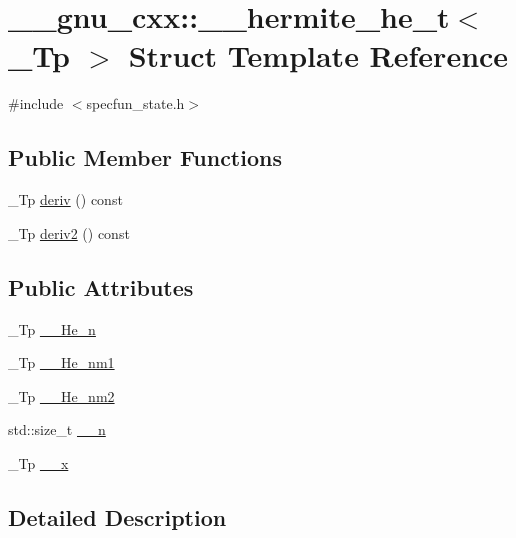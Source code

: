 \hypertarget{struct____gnu__cxx_1_1____hermite__he__t}{}\section{\+\_\+\+\_\+gnu\+\_\+cxx\+:\+:\+\_\+\+\_\+hermite\+\_\+he\+\_\+t$<$ \+\_\+\+Tp $>$ Struct Template Reference}
\label{struct____gnu__cxx_1_1____hermite__he__t}


{\ttfamily \#include $<$specfun\+\_\+state.\+h$>$}

\subsection*{Public Member Functions}
\begin{DoxyCompactItemize}
\item 
\+\_\+\+Tp \hyperlink{struct____gnu__cxx_1_1____hermite__he__t_a19c1df6940043e1b106b8cf70bddd60e}{deriv} () const
\item 
\+\_\+\+Tp \hyperlink{struct____gnu__cxx_1_1____hermite__he__t_a4d885a96a96b12e9e8b6ad62628cfff3}{deriv2} () const
\end{DoxyCompactItemize}
\subsection*{Public Attributes}
\begin{DoxyCompactItemize}
\item 
\+\_\+\+Tp \hyperlink{struct____gnu__cxx_1_1____hermite__he__t_ad1a90d0045c4fe567482ebd8cf875842}{\+\_\+\+\_\+\+He\+\_\+n}
\item 
\+\_\+\+Tp \hyperlink{struct____gnu__cxx_1_1____hermite__he__t_a954844caba412a30632beb4263862e44}{\+\_\+\+\_\+\+He\+\_\+nm1}
\item 
\+\_\+\+Tp \hyperlink{struct____gnu__cxx_1_1____hermite__he__t_a1df5a7d99880aae14ee9966bbe1b1179}{\+\_\+\+\_\+\+He\+\_\+nm2}
\item 
std\+::size\+\_\+t \hyperlink{struct____gnu__cxx_1_1____hermite__he__t_aab07d11dda51ca36b1c88e8dd8550046}{\+\_\+\+\_\+n}
\item 
\+\_\+\+Tp \hyperlink{struct____gnu__cxx_1_1____hermite__he__t_a24b66f5153ce3e231976e18b4eccb2a0}{\+\_\+\+\_\+x}
\end{DoxyCompactItemize}


\subsection{Detailed Description}
